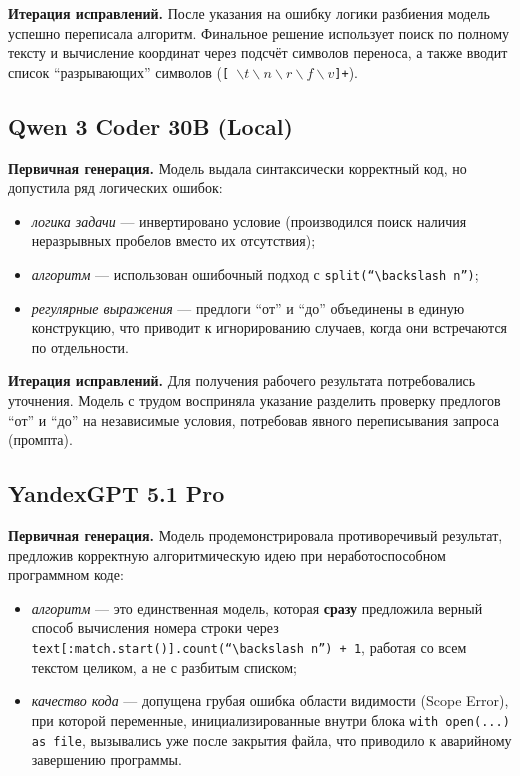 \textbf{Итерация исправлений.} После указания на ошибку логики разбиения модель успешно переписала алгоритм. Финальное решение использует поиск по полному тексту и вычисление координат через подсчёт символов переноса, а также вводит список ``разрывающих'' символов (\texttt{[ $\backslash t\backslash n\backslash r\backslash f\backslash v$]+}).

\subsection{Qwen 3 Coder 30B (Local)}
\textbf{Первичная генерация.} Модель выдала синтаксически корректный код, но допустила ряд логических ошибок:
\begin{itemize}
    \item \textit{логика задачи} --- инвертировано условие (производился поиск наличия неразрывных пробелов вместо их отсутствия);
    \item \textit{алгоритм} --- использован ошибочный подход с \texttt{split(``$\backslash n$'')};
    \item \textit{регулярные выражения} --- предлоги ``от'' и ``до'' объединены в единую конструкцию, что приводит к игнорированию случаев, когда они встречаются по отдельности.
\end{itemize}

\textbf{Итерация исправлений.} Для получения рабочего результата потребовались уточнения. Модель с трудом восприняла указание разделить проверку предлогов ``от'' и ``до'' на независимые условия, потребовав явного переписывания запроса (промпта).

\subsection{YandexGPT 5.1 Pro}
\textbf{Первичная генерация.} Модель продемонстрировала противоречивый результат, предложив корректную алгоритмическую идею при неработоспособном программном коде:
\begin{itemize}
    \item \textit{алгоритм} --- это единственная модель, которая \textbf{сразу} предложила верный способ вычисления номера строки через \texttt{text[:match.start()].count(``$\backslash n$'') + 1}, работая со всем текстом целиком, а не с разбитым списком;
    \item \textit{качество кода} --- допущена грубая ошибка области видимости (Scope Error), при которой переменные, инициализированные внутри блока \texttt{with open(...) as file}, вызывались уже после закрытия файла, что приводило к аварийному завершению программы.
\end{itemize}

